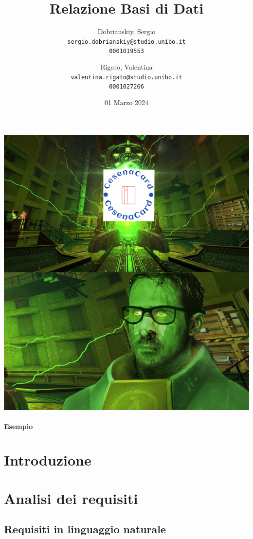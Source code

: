 \documentclass{article}
\title{Relazione Basi di Dati}
\author{
  Dobrianskiy, Sergio \\
  \texttt{sergio.dobrianskiy@studio.unibo.it}\\
  \texttt{0001019553}
  \and
  Rigato, Valentina\\
  \texttt{valentina.rigato@studio.unibo.it}\\
  \texttt{0001027266}
}
\date{01 Marzo 2024}
\begin{document}
 
\maketitle
\includegraphics[width=0.95\columnwidth]{CesenaCard2.png}
\newpage

\paragraph{Esempio}

\newpage

\tableofcontents
\clearpage

\section{Introduzione}



\section{Analisi dei requisiti}

\subsection{Requisiti in linguaggio naturale}

\end{document}
